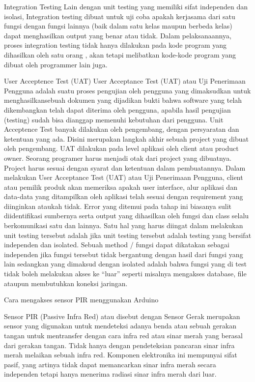 Integration Testing
Lain dengan unit testing yang memiliki sifat independen dan isolasi, Integration testing dibuat untuk uji coba apakah kerjasama dari satu fungsi dengan fungsi lainnya (baik dalam satu kelas maupun berbeda kelas) dapat menghasilkan output yang benar atau tidak. Dalam pelaksanaannya, proses integration testing tidak hanya dilakukan pada kode program yang dihasilkan oleh satu orang , akan tetapi melibatkan  kode-kode program yang dibuat oleh programmer lain juga.

User Acceptence Test (UAT)
User Acceptance Test (UAT) atau Uji Penerimaan Pengguna adalah suatu proses pengujian oleh pengguna yang dimaksudkan untuk menghasilkansebuah dokumen yang dijadikan bukti bahwa software yang telah dikembangkan telah dapat diterima oleh pengguna, apabila hasil pengujian (testing) sudah bisa dianggap memenuhi kebutuhan dari pengguna. Unit Acceptence Test banyak dilakukan oleh pengembang, dengan persyaratan dan ketentuan yang ada. Disini merupakan langkah akhir sebuah project yang dibuat oleh pengembang. UAT dilakukan pada level aplikasi oleh client atau product owner. Seorang programer harus menjadi otak dari project yang dibuatnya. Project harus sesuai dengan syarat dan ketentuan dalam pembuatannya.
Dalam melakukan User Acceptance Test (UAT) atau Uji Penerimaan Pengguna, client atau pemilik produk akan memeriksa apakah user interface, alur aplikasi dan data-data yang ditampilkan oleh aplikasi telah sesuai dengan requirement yang diinginkan ataukah tidak. Error yang ditemui pada tahap ini biasanya sulit diidentifikasi sumbernya serta output yang dihasilkan oleh fungsi dan class selalu berkomunikasi satu dan lainnya.
Satu hal yang harus diingat dalam melakukan unit testing tersebut adalah jika unit testing tersebut adalah testing yang bersifat independen dan isolated. Sebuah method / fungsi dapat dikatakan sebagai independen jika fungsi tersebut tidak bergantung dengan hasil dari fungsi yang lain sedangkan yang dimaksud dengan isolated adalah bahwa fungsi yang di test tidak boleh melakukan akses ke “luar” seperti misalnya mengakses database, file ataupun membutuhkan koneksi jaringan.


Cara mengakses sensor PIR menggunakan Arduino

Sensor PIR (Passive Infra Red) atau disebut dengan Sensor Gerak merupakan sensor yang digunakan untuk mendeteksi adanya benda atau sebuah gerakan tangan untuk mentransfer dengan cara infra red atau sinar merah yang berasal dari gerakan tangan. Tidak hanya dengan pendeteksian pancaran sinar infra merah melaikan sebuah infra red.
Komponen elektronika ini mempunyai sifat pasif, yang artinya tidak dapat memancarkan sinar infra merah secara independen tetapi hanya menerima radiasi sinar infra merah dari luar.

